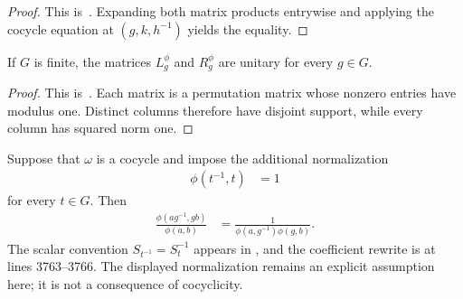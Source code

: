 \begin{proof}\leanok
    This is~\cite[``Commutation of twisted left and right
        actions'']{QICLean2026Blueprint}.
    Expanding both matrix products entrywise and applying the cocycle equation
    at $(g,k,h^{-1})$ yields the equality.
\end{proof}

\begin{lemma}
    \label{thm:mpug_twisted_regular_unitary}
    \leanok
    If $G$ is finite, the matrices $L_g^\phi$ and $R_g^\phi$ are unitary for
    every $g\in G$.
\end{lemma}

\begin{proof}\leanok
    This is~\cite[``Unitarity of twisted regular
        matrices'']{QICLean2026Blueprint}.
    Each matrix is a permutation matrix whose nonzero entries have modulus
    one.  Distinct columns therefore have disjoint support, while every column
    has squared norm one.
\end{proof}

\begin{lemma}
    \label{thm:mpug_onsite_gauss_phase}
    \leanok
    Suppose that $\omega$ is a cocycle and impose the additional normalization
    \begin{align}
        \phi(t^{-1},t) & =1
    \end{align}
    for every $t\in G$.  Then
    \begin{align}
        \frac{\phi(ag^{-1},gb)}{\phi(a,b)}
         & =\frac{1}{\phi(a,g^{-1})\phi(g,b)}.
        \label{eq:mpug_onsite_gauss_phase}
    \end{align}
    The scalar convention $S_{t^{-1}}=S_t^{-1}$ appears in
    \cite[line~238]{FrancoRubio2025MPUGauging}, and the coefficient rewrite is
    at lines 3763--3766. The displayed normalization remains an explicit
    assumption here; it is not a consequence of cocyclicity.
\end{lemma}

